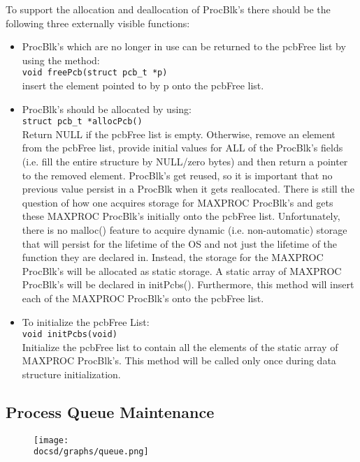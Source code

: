 To support the allocation and deallocation of ProcBlk’s there should be the following three externally visible functions:
\begin{itemize}
	\item ProcBlk’s which are no longer in use can be returned to the pcbFree list by using the method:\\
		\verb+void freePcb(struct pcb_t *p)+\\
		insert the element pointed to by p onto the pcbFree list.
	\item ProcBlk’s should be allocated by using:\\
		\verb+struct pcb_t *allocPcb()+\\
		Return NULL if the pcbFree list is empty. Otherwise, remove an element from the pcbFree list, provide initial values for ALL of the ProcBlk’s fields (i.e. fill the entire structure by NULL/zero bytes) and then return a pointer to the removed element. ProcBlk’s get reused, so it is important that no previous value persist in a ProcBlk when it gets reallocated. 
		There is still the question of how one acquires storage for MAXPROC ProcBlk’s and gets these MAXPROC ProcBlk’s initially onto the pcbFree list. 
		Unfortunately, there is no malloc() feature to acquire dynamic (i.e. non-automatic) storage that will persist for the lifetime of the OS and not just the lifetime of the function they are declared in. 
		Instead, the storage for the MAXPROC ProcBlk’s will be allocated as static storage. 
		A static array of MAXPROC ProcBlk’s will be declared in initPcbs(). 
		Furthermore, this method will insert each of the MAXPROC ProcBlk’s onto the pcbFree list.
	\item To initialize the pcbFree List:\\
		\verb+void initPcbs(void)+\\
		Initialize the pcbFree list to contain all the elements of the static array of MAXPROC ProcBlk’s. This method will be called only once during data structure initialization.
\end{itemize}

\subsection{Process Queue Maintenance}

\begin{figure}[htbp]
	\centering
	\texttt{[image: \\docsd/graphs/queue.png]}
	\caption*{}
\end{figure}


